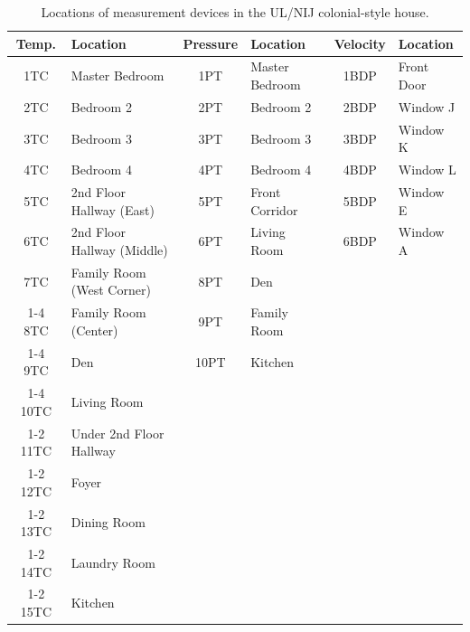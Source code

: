 \begin{table}[ht!]
\centering
\caption[Locations of measurement devices in the UL/NIJ colonial-style house]
{Locations of measurement devices in the UL/NIJ colonial-style house.}
\label{Colonial_devices}
\begin{tabular}{|c|l||c|l||c|l|}
\hline
Temp.              & Location                & Pressure             & Location          & Velocity              & Location       \\ \hline \hline
1TC              & Master Bedroom          & 1PT                & Master Bedroom    & 1BDP                & Front Door    \\ \hline
2TC              & Bedroom 2             & 2PT                & Bedroom 2       & 2BDP                & Window J       \\ \hline
3TC              & Bedroom 3             & 3PT                & Bedroom 3       & 3BDP                & Window K       \\ \hline
4TC              & Bedroom 4             & 4PT                & Bedroom 4       & 4BDP                & Window L       \\ \hline
5TC              & 2nd Floor Hallway (East)    & 5PT                & Front Corridor    & 5BDP                & Window E       \\ \hline
6TC              & 2nd Floor Hallway (Middle)& 6PT                & Living Room       & 6BDP                & Window A       \\ \hline
7TC              & Family Room (West Corner)   & 8PT                & Den             & \multicolumn{2}{r|}{}              \\ \cline{1-4}
8TC              & Family Room (Center)       & 9PT                & Family Room       & \multicolumn{2}{r|}{}              \\ \cline{1-4}
9TC              & Den                   & 10PT                & Kitchen          & \multicolumn{2}{r|}{}             \\ \cline{1-4}
10TC             & Living Room             & \multicolumn{4}{r|}{}                                                 \\ \cline{1-2}
11TC              & Under 2nd Floor Hallway    & \multicolumn{4}{r|}{}                                              \\ \cline{1-2}
12TC              & Foyer                & \multicolumn{4}{r|}{}                                               \\ \cline{1-2}
13TC              & Dining Room             & \multicolumn{4}{r|}{}                                               \\ \cline{1-2}
14TC              & Laundry Room             & \multicolumn{4}{r|}{}                                               \\ \cline{1-2}
15TC              & Kitchen                & \multicolumn{4}{r|}{}                                               \\ \hline
\end{tabular}
\end{table}

